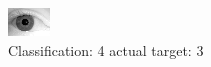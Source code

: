 \begin{figure}[h!]
\begin{center}
\includegraphics[width=0.60\columnwidth]{figures/ID2112_class_4_target_3.png}
\end{center}
\caption{ Classification: 4 actual target: 3}
\label{fig:ID2112_class_4_target_3}
\end{figure}
